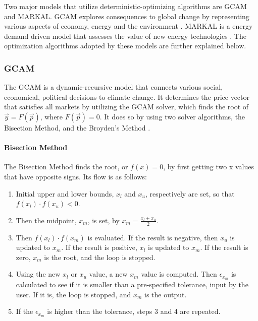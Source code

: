 Two major models that utilize deterministic-optimizing algorithms are
\gls{GCAM} and \gls{MARKAL}. \gls{GCAM} explores consequences to global
change by representing various aspects of economy, energy and the environment 
\cite{edmonds_advanced_1994}.
\gls{MARKAL} is a energy demand driven model that assesses the value of new
energy technologies \cite{fishbone_markal_1981}. The optimization algorithms adopted
by these models are further explained below.

\subsubsection{ \gls{GCAM}}
The \gls{GCAM} is a dynamic-recursive model that connects various
social, economical, political decisions to climate change. 
It determines the price vector that satisfies all markets by
utilizing the GCAM solver, which finds the root of $\vec{y} = F(\vec{p})$,
where $F(\vec{p})=0$. It does so by using two solver algorithms, the Bisection Method,
and the Broyden's Method \cite{patel_gcam_2016-1}. 

\paragraph{Bisection Method}
The Bisection Method finds the root, or $f(x)=0$, by first
getting two x values that have opposite signs. Its flow is as follows:

\begin{enumerate}
	\item Initial upper and lower bounds, $x_l$ and $x_u$, respectively are set,
	so that $f(x_l) \cdot f(x_u) <0 $.
	\item Then the midpoint, $x_m$, is set, by $x_m = \frac{x_l+x_u}{2}$.
	\item Then $f(x_l) \cdot f(x_m)$ is evaluated. If the result is negative,
	then $x_u$ is updated to $x_m$. If the result is positive, $x_l$ is updated
	to $x_m$. If the result is zero, $x_m$ is the root, and the loop is stopped.
	\item Using the new $x_l$ or $x_u$ value, a new $x_m$ value is computed. Then
	$\epsilon_{x_m}$ is calculated to see if it is smaller than a pre-specified tolerance,
	input by the user. If it is, the loop is stopped, and $x_m$ is the output.
	\item If the $\epsilon_{x_m}$ is higher than the tolerance, steps 3 and 4 are repeated.
\end{enumerate}


